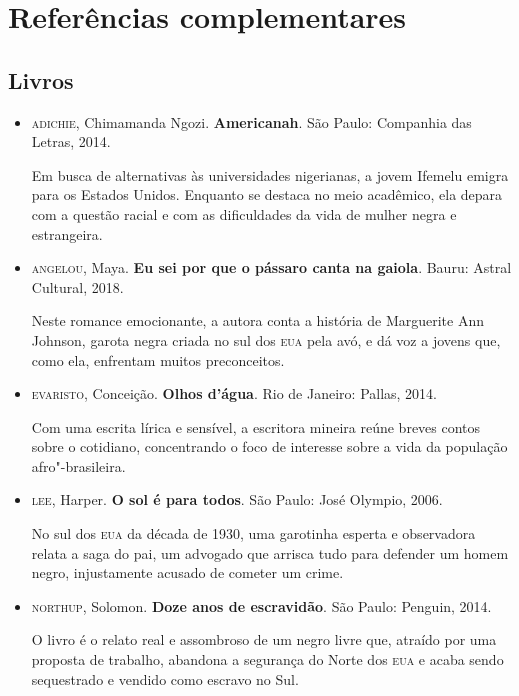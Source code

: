 \documentclass[11pt]{extarticle}
\begin{document}
\section{Referências complementares}

\subsection{Livros}

\begin{itemize}
\item\textsc{adichie}, Chimamanda Ngozi. \textbf{Americanah}. São Paulo: Companhia
  das Letras, 2014.

Em busca de alternativas às universidades nigerianas, a jovem Ifemelu
emigra para os Estados Unidos. Enquanto se destaca no meio acadêmico,
ela depara com a questão racial e com as dificuldades da vida de mulher
negra e estrangeira.

\item\textsc{angelou}, Maya. \textbf{Eu sei por que o pássaro canta na gaiola}.
  Bauru: Astral Cultural, 2018.

Neste romance emocionante, a autora conta a história de Marguerite Ann
Johnson, garota negra criada no sul dos \textsc{eua} pela avó, e dá voz a jovens
que, como ela, enfrentam muitos preconceitos.

\item\textsc{evaristo}, Conceição. \textbf{Olhos d'água}. Rio de Janeiro: Pallas, 2014.

Com uma escrita lírica e sensível, a escritora mineira reúne breves
contos sobre o cotidiano, concentrando o foco de interesse sobre a vida
da população afro"-brasileira.

\item\textsc{lee}, Harper. \textbf{O sol é para todos}. São Paulo: José Olympio,
  2006.

No sul dos \textsc{eua} da década de 1930, uma garotinha esperta e observadora
relata a saga do pai, um advogado que arrisca tudo para defender um
homem negro, injustamente acusado de cometer um crime.

\item\textsc{northup}, Solomon. \textbf{Doze anos de escravidão}. São Paulo:
  Penguin, 2014.

O livro é o relato real e assombroso de um negro livre que, atraído por
uma proposta de trabalho, abandona a segurança do Norte dos \textsc{eua} e acaba
sendo sequestrado e vendido como escravo no Sul.


\end{itemize}
\end{document}
